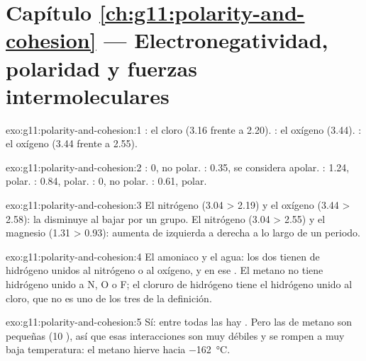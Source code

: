\section*{Capítulo \ref{ch:g11:polarity-and-cohesion} --- Electronegatividad, polaridad y fuerzas intermoleculares}

\begin{solution}{exo:g11:polarity-and-cohesion:1}
: el cloro (3.16 frente a 2.20). : el oxígeno (3.44).
: el oxígeno (3.44 frente a 2.55).
\end{solution}

\begin{solution}{exo:g11:polarity-and-cohesion:2}
: 0, no polar. : 0.35, se considera apolar. :
1.24, polar. : 0.84, polar. : 0, no polar. :
0.61, polar.
\end{solution}

\begin{solution}{exo:g11:polarity-and-cohesion:3}
El nitrógeno (3.04 > 2.19) y el oxígeno (3.44 > 2.58): la
 disminuye al bajar por un grupo. El nitrógeno
(3.04 > 2.55) y el magnesio (1.31 > 0.93): aumenta de izquierda a
derecha a lo largo de un periodo.
\end{solution}

\begin{solution}{exo:g11:polarity-and-cohesion:4}
El amoniaco y el agua: los dos tienen  de hidrógeno unidos al
nitrógeno o al oxígeno, y  en ese . El metano no
tiene hidrógeno unido a N, O o F; el cloruro de hidrógeno tiene el
hidrógeno unido al cloro, que no es uno de los tres  de la
definición.
\end{solution}

\begin{solution}{exo:g11:polarity-and-cohesion:5}
Sí: entre todas las  hay . Pero
las  de metano son pequeñas (10 ), así que esas
interacciones son muy débiles y se rompen a muy baja temperatura: el
metano hierve hacia \qty{-162}{\celsius}.
\end{solution}


